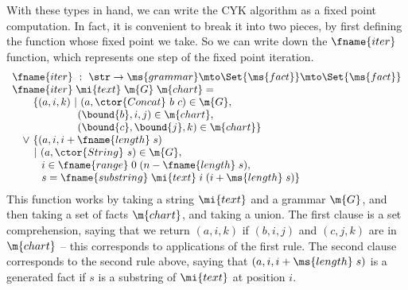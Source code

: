 With these types in hand, we can write the CYK algorithm as a fixed
point computation. In fact, it is convenient to break it into two
pieces, by first defining the function whose fixed point we take. So
we can write down the $\fname{iter}$ function, which represents one step of
the fixed point iteration.
\[\begin{array}{l}
\fname{iter} ~:~ \str \uto \ms{grammar} \mto \Set{\ms{fact}} \mto \Set{\ms{fact}}\\
\fname{iter} \;\mi{text} \;\m{G} \;\m{chart} =\\
\hspace{1em}\phantom{\vee~}
\{(a,i,k) ~|~ (a, \ctor{Concat}~b~c) \in \m{G},\\
\hspace{6.25em} (\bound{b},i,j) \in \m{chart},\\
\hspace{6.25em} (\bound{c},\bound{j},k) \in \m{chart}\}\\
\hspace{1em}\vee~ \{(a,i,i+\fname{length}\;s)\\
\hspace{2.1em}|~ (a, \ctor{String}~s) \in \m{G},\\
\hspace{2.2em}\phantom{|~} i \in \fname{range}\;0\;(n-\fname{length}\;s),\\
\hspace{2.2em}\phantom{|~}
s = \fname{substring} \;\mi{text} \;i \;(i+\ms{length}\;s)\}
\end{array}\]
This function works by taking a string $\mi{text}$ and a grammar $\m{G}$, and
then taking a set of facts $\m{chart}$, and taking a union. The first clause is
a set comprehension, saying that we return $(a, i, k)$ if $(b, i, j)$ and $(c,
j, k)$ are in $\m{chart}$ -- this corresponds to applications of the first rule.
The second clause corresponds to the second rule above, saying that $(a, i, i +
\ms{length}\;s)$ is a generated fact if $s$ is a substring of $\mi{text}$ at
position $i$.


